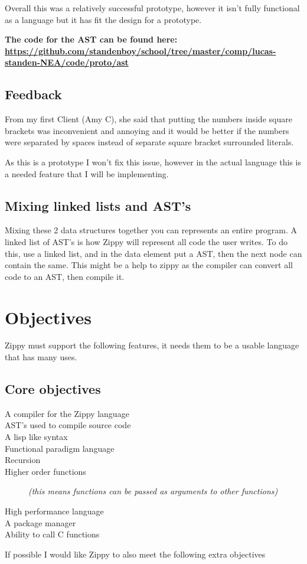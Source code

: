 \documentclass[a4paper,12pt]{article}
\begin{document}
{Overall this was a relatively successful prototype, however it isn't fully functional 
as a language but it has fit the design for a prototype.

\textbf{The code for the AST can be found here:
\url{https://github.com/standenboy/school/tree/master/comp/lucas-standen-NEA/code/proto/ast}}

\subsection{Feedback}
From my first Client (Amy C), she said that putting the numbers inside square brackets 
was inconvenient and annoying and it would be better if the numbers were separated
by spaces instead of separate square bracket surrounded literals.

As this is a prototype I won't fix this issue, however in the actual language this is 
a needed feature that I will be implementing.

\subsection{Mixing linked lists and AST's}
Mixing these 2 data structures together you can represents an entire program. A linked 
list of AST's is how Zippy will represent all code the user writes. To do this, use a 
linked list, and in the data element put a AST, then the next node can contain the same. 
This might be a help to zippy as the compiler can convert all code to an AST, then 
compile it.
\section{Objectives}
Zippy must support the following features, it needs them to be a usable language that has 
many uses.
\subsection{Core objectives}
\begin{description}
	\item[A compiler for the Zippy language]
	\item[AST's used to compile source code]
	\item[A lisp like syntax]
	\item[Functional paradigm language]
	\item[Recursion]
	\item[Higher order functions] \textit{(this means functions can be passed as arguments to 
		other functions)}
	\item[High performance language]
	\item[A package manager]
	\item[Ability to call C functions]
\end{description}
If possible I would like Zippy to also meet the following extra objectives
}
\end{document}
